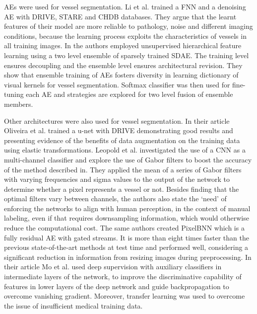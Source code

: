 \documentclass[journal]{IEEEtran}
\begin{document}
AEs were used for vessel segmentation.
Li et al.\cite{li2016cross} trained a FNN and a denoising AE with DRIVE, STARE and CHDB databases.
They argue that the learnt features of their model are more reliable to pathology, noise and different imaging conditions, because the learning process exploits the characteristics of vessels in all training images.
In\cite{lahiri2016deep} the authors employed unsupervised hierarchical feature learning using a two level ensemble of sparsely trained SDAE\@.
The training level ensures decoupling and the ensemble level ensures architectural revision.
They show that ensemble training of AEs fosters diversity in learning dictionary of visual kernels for vessel segmentation.
Softmax classifier was then used for fine-tuning each AE and strategies are explored for two level fusion of ensemble members.

Other architectures were also used for vessel segmentation.
In their article Oliveira et al.\cite{oliveira2017augmenting} trained a u-net with DRIVE demonstrating good results and presenting evidence of the benefits of data augmentation on the training data using elastic transformations.
Leopold et al.\cite{leopold2017use} investigated the use of a CNN as a multi-channel classifier and explore the use of Gabor filters to boost the accuracy of the method described in\cite{leopold2017segmentation}.
They applied the mean of a series of Gabor filters with varying frequencies and sigma values to the output of the network to determine whether a pixel represents a vessel or not.
Besides finding that the optimal filters vary between channels, the authors also state the `need' of enforcing the networks to align with human perception, in the context of manual labeling, even if that requires downsampling information, which would otherwise reduce the computational cost.
The same authors\cite{leopold2017pixelbnn} created PixelBNN which is a fully residual AE with gated streams.
It is more than eight times faster than the previous state-of-the-art methods at test time and performed well, considering a significant reduction in information from resizing images during preprocessing.
In their article Mo et al.\cite{mo2017multi} used deep supervision with auxiliary classifiers in intermediate layers of the network, to improve the discriminative capability of features in lower layers of the deep network and guide backpropagation to overcome vanishing gradient.
Moreover, transfer learning was used to overcome the issue of insufficient medical training data.
\end{document}
